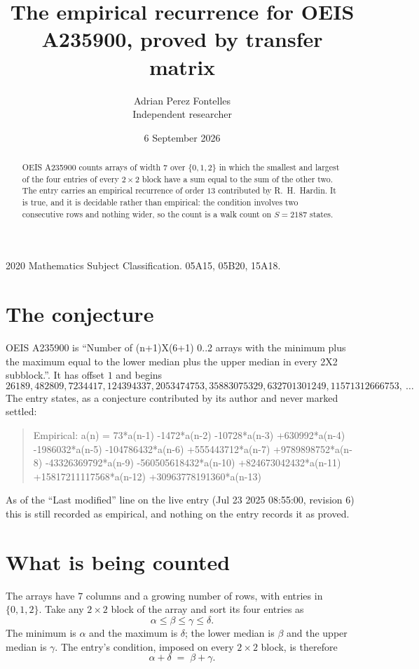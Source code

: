 \documentclass[11pt,a4paper]{article}
\title{The empirical recurrence for OEIS A235900, proved by transfer matrix}
\author{Adrian Perez Fontelles\\ \small Independent researcher}
\date{6 September 2026}
\theoremstyle{plain}
\theoremstyle{definition}
\begin{document}
\maketitle

\begin{abstract}
OEIS A235900 counts arrays of width $7$ over $\{0,1,2\}$ in which the smallest and largest of the
four entries of every $2\times2$ block have a sum equal to the sum of the other two. The entry
carries an empirical recurrence of order $13$ contributed by R.~H.~Hardin. It is true, and
it is decidable rather than empirical: the condition involves two consecutive rows and nothing
wider, so the count is a walk count on $S=2187$ states.
\end{abstract}

\noindent\small 2020 Mathematics Subject Classification. 05A15, 05B20, 15A18.\normalsize

\section{The conjecture}

OEIS A235900 is ``Number of (n+1)X(6+1) 0..2 arrays with the minimum plus the maximum equal to the lower median plus the upper median in every 2X2 subblock.''. It has offset $1$ and begins
\[
26189, 482809, 7234417, 124394337, 2053474753, 35883075329, 632701301249, 11571312666753,\ \dots
\]
The entry states, as a conjecture contributed by its author and never marked settled:
\begin{quote}
Empirical: a(n) = 73*a(n-1) -1472*a(n-2) -10728*a(n-3) +630992*a(n-4) -1986032*a(n-5) -104786432*a(n-6) +555443712*a(n-7) +9789898752*a(n-8) -43326369792*a(n-9) -560505618432*a(n-10) +824673042432*a(n-11) +15817211117568*a(n-12) +30963778191360*a(n-13)
\end{quote}
As of the ``Last modified'' line on the live entry (Jul 23 2025 08:55:00, revision 6) this is still
recorded as empirical, and nothing on the entry records it as proved.

\section{What is being counted}

The arrays have $7$ columns and a growing number of rows, with entries in $\{0,1,2\}$. Take any
$2\times2$ block of the array and sort its four entries as
\[
\alpha\le\beta\le\gamma\le\delta .
\]
The minimum is $\alpha$ and the maximum is $\delta$; the lower median is $\beta$ and the upper
median is $\gamma$. The entry's condition, imposed on every $2\times2$ block, is therefore
\[
\alpha+\delta\;=\;\beta+\gamma .
\]
\end{document}
